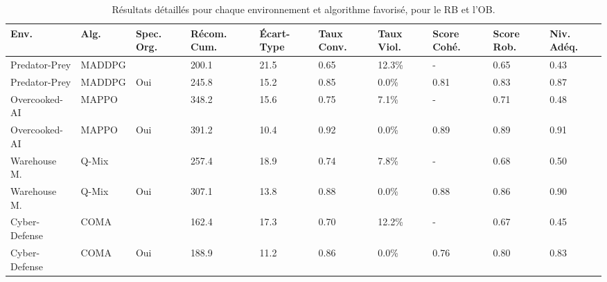 \documentclass[francais,ROIA,Unicode,manuscript]{cedram}
\begin{document}
\begin{table*}[h!]
    \centering
    \caption{Résultats détaillés pour chaque environnement et algorithme favorisé, pour le RB et l'OB.}
    \label{tab:detailed_results}
    \footnotesize
    \renewcommand{\arraystretch}{1.2}
    \begin{tabular}{p{1.8cm}p{1.1cm}p{.5cm}p{0.7cm}p{0.7cm}p{0.7cm}p{0.7cm}p{0.7cm}p{0.7cm}p{0.7cm}}
        \hline
        \textbf{Env.} & \textbf{Alg.} & \textbf{Spec. Org.} & \textbf{Récom. Cum.} & \textbf{Écart-Type} & \textbf{Taux Conv.} & \textbf{Taux Viol.} & \textbf{Score Cohé.} & \textbf{Score Rob.} & \textbf{Niv. Adéq.} \\ \hline
        Predator-Prey & MADDPG        &                     & 200.1                & 21.5                & 0.65                & 12.3\%              & -                    & 0.65                & 0.43                \\
        Predator-Prey & MADDPG        & Oui                 & 245.8                & 15.2                & 0.85                & 0.0\%               & 0.81                 & 0.83                & 0.87                \\
        Overcooked-AI & MAPPO         &                     & 348.2                & 15.6                & 0.75                & 7.1\%               & -                    & 0.71                & 0.48                \\
        Overcooked-AI & MAPPO         & Oui                 & 391.2                & 10.4                & 0.92                & 0.0\%               & 0.89                 & 0.89                & 0.91                \\
        Warehouse M.  & Q-Mix         &                     & 257.4                & 18.9                & 0.74                & 7.8\%               & -                    & 0.68                & 0.50                \\
        Warehouse M.  & Q-Mix         & Oui                 & 307.1                & 13.8                & 0.88                & 0.0\%               & 0.88                 & 0.86                & 0.90                \\
        Cyber-Defense & COMA          &                     & 162.4                & 17.3                & 0.70                & 12.2\%              & -                    & 0.67                & 0.45                \\
        Cyber-Defense & COMA          & Oui                 & 188.9                & 11.2                & 0.86                & 0.0\%               & 0.76                 & 0.80                & 0.83                \\ \hline
    \end{tabular}
\end{table*}
\end{document}
